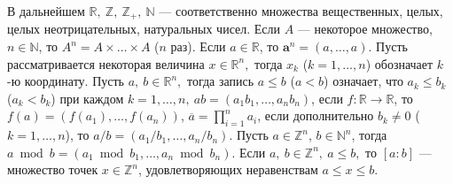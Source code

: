 


В дальнейшем $\mathbb{R},\ 
\mathbb{Z},
\ \mathbb{Z}_+,
\ \mathbb{N}$ ---
соответственно множества вещественных, 
целых,
целых неотрицательных, натуральных
чисел.
Если $A$ --- некоторое множество, $n\in\mathbb{N}$, то $A^n=A\times\ldots \times A$ ($n$ раз). 
Если $a\in\mathbb{R}$, то $\mathbf{a}^n=(a,\ldots,a)$.
Пусть рассматривается некоторая величина $x\in\mathbb{R}^n,$ тогда
$x_k$ ($k=1,\ldots,n$) обозначает $k$-ю координату. 
Пусть $a,\ b \in \mathbb{R}^n,$ тогда запись $a\leqslant b$ ($a<b$) означает, что 
$a_k\leqslant b_k$ ($a_k<b_k$) при каждом $k=1,\ldots,n,\ ab=(a_1b_1,\ldots,a_n b_n)$,
если
$f\colon\mathbb{R}\to\mathbb{R}$,
то $f(a)=(f(a_1),\ldots,f(a_n))$,
$\overline{a}=\prod_{i=1}^n a_i$, 
если дополнительно $b_k\neq 0$ ($k=1,\ldots, n$), то $a/b=(a_1/b_1,\ldots,a_n/ b_n)$.  
Пусть $a\in \mathbb{Z}^n$, $b\in \mathbb{N}^n$, тогда $a \bmod b =(a_1 \bmod b_1,\ldots,a_n \bmod b_n)$.
Если $a,\ b \in \mathbb{Z}^n,\ a\leqslant b,$ то $[a:b]$ --- множество точек
$x\in \mathbb{Z}^n$, удовлетворяющих неравенствам $a\leqslant x \leqslant b$.

